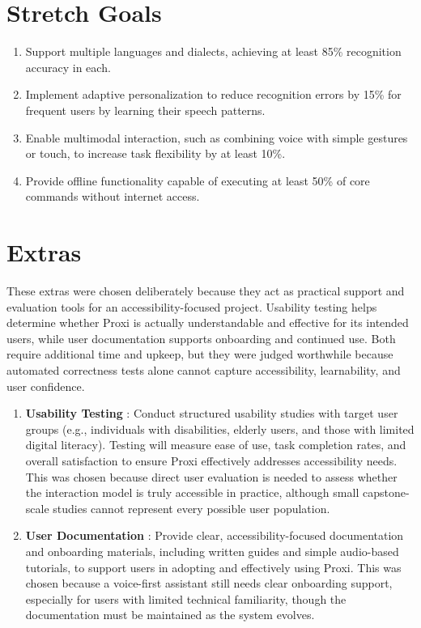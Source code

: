 \documentclass{article}
\begin{document}
\section{Stretch Goals}
\begin{enumerate}
    \item Support multiple languages and dialects, achieving at least 85\% recognition accuracy in each.
    \item Implement adaptive personalization to reduce recognition errors by 15\% for frequent users by learning their speech patterns.
    \item Enable multimodal interaction, such as combining voice with simple gestures or touch, to increase task flexibility by at least 10\%.
    \item Provide offline functionality capable of executing at least 50\% of core commands without internet access.
\end{enumerate}

\section{Extras}
These extras were chosen deliberately because they act as practical
support and evaluation tools for an accessibility-focused project.
Usability testing helps determine whether Proxi is actually understandable
and effective for its intended users, while user documentation supports
onboarding and continued use. Both require additional time and upkeep,
but they were judged worthwhile because automated correctness tests alone
cannot capture accessibility, learnability, and user confidence.

\begin{enumerate}
    \item \textbf{Usability Testing} : Conduct structured usability studies with target user groups (e.g., individuals with disabilities, elderly users, and those with limited digital literacy). Testing will measure ease of use, task completion rates, and overall satisfaction to ensure Proxi effectively addresses accessibility needs. This was chosen because direct user evaluation is needed to assess whether the interaction model is truly accessible in practice, although small capstone-scale studies cannot represent every possible user population.
    \item \textbf{User Documentation} : Provide clear, accessibility-focused documentation and onboarding materials, including written guides and simple audio-based tutorials, to support users in adopting and effectively using Proxi. This was chosen because a voice-first assistant still needs clear onboarding support, especially for users with limited technical familiarity, though the documentation must be maintained as the system evolves.
\end{enumerate}
\end{document}
